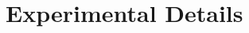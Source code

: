 \documentclass[10pt]{article}
\begin{document}
\appendix
\section{Experimental Details}

\end{document}
